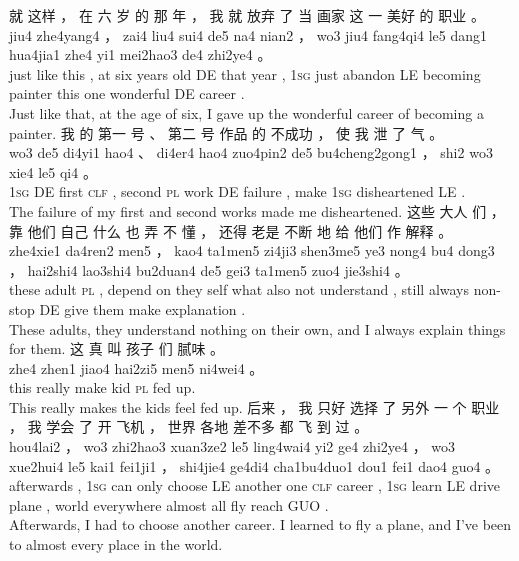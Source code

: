 \documentclass[UTF8]{ctexart}
\begin{document}
\begin{exe}
\ex
\glll
就 这样 ， 在 六 岁 的 那 年 ， 我 就 放弃 了 当 画家 这 一 美好 的 职业 。
\\
jiu4 zhe4yang4 ， zai4 liu4 sui4 de5 na4 nian2 ， wo3 jiu4 fang4qi4 le5 dang1 hua4jia1 zhe4 yi1 mei2hao3 de4 zhi2ye4 。
\\
just {like this} , at six {years old} DE that year , \textsc{1sg} just abandon LE becoming painter this one wonderful DE career .
\\
\trans Just like that, at the age of six, I gave up the wonderful career of becoming a painter.
\ex
\glll
我 的 第一 号 、 第二 号 作品 的 不成功 ， 使 我 泄 了 气 。
\\
wo3 de5 di4yi1 hao4 、 di4er4 hao4 zuo4pin2 de5 bu4cheng2gong1 ， shi2 wo3 xie4 le5 qi4 。
\\
\textsc{1sg} DE first \textsc{clf} , second \textsc{pl} work DE failure , make \textsc{1sg} disheartened LE {} .
\\
\trans The failure of my first and second works made me disheartened.
\ex
\glll
这些 大人 们 ， 靠 他们 自己 什么 也 弄 不 懂 ， 还得 老是 不断 地 给 他们 作 解释 。
\\
zhe4xie1 da4ren2 men5 ， kao4 ta1men5 zi4ji3 shen3me5 ye3 nong4 bu4 dong3 ， hai2shi4 lao3shi4 bu2duan4 de5 gei3 ta1men5 zuo4 jie3shi4 。
\\
these adult \textsc{pl} , {depend on} they self what also {} not understand , still always {non-stop} DE give them make explanation .
\\
\trans These adults, they understand nothing on their own, and I always explain things for them. 
\ex
\glll
这 真 叫 孩子 们 腻味 。
\\
zhe4 zhen1 jiao4 hai2zi5 men5 ni4wei4 。
\\
this really make kid \textsc{pl} {fed up}.
\\
\trans This really makes the kids feel fed up. 
\ex
\glll
后来 ， 我 只好 选择 了 另外 一 个 职业 ， 我 学会 了 开 飞机 ， 世界 各地 差不多 都 飞 到 过 。
\\
hou4lai2 ， wo3 zhi2hao3 xuan3ze2 le5 ling4wai4 yi2 ge4 zhi2ye4 ， wo3 xue2hui4 le5 kai1 fei1ji1 ， shi4jie4 ge4di4 cha1bu4duo1 dou1 fei1 dao4 guo4 。
\\
afterwards , \textsc{1sg} {can only} choose LE another one \textsc{clf} career , \textsc{1sg} learn LE drive plane , world everywhere almost all fly reach GUO .
\\
\trans Afterwards, I had to choose another career. I learned to fly a plane, and I've been to almost every place in the world. 

\end{exe}
\end{document}
